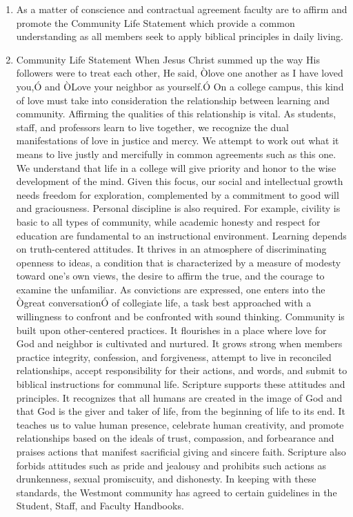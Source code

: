 \documentclass[letterpaper, 11pt]{article}
\begin{document}
				\begin{enumerate}[label=\alph*)]
					\item{As a matter of conscience and contractual agreement faculty are to affirm and promote the Community Life Statement which provide a common understanding as all members seek to apply biblical principles in daily living.}
					\item{Community Life Statement
						When Jesus Christ summed up the way His followers were to treat each other, He said, Òlove one another as I have loved you,Ó and ÒLove your neighbor as yourself.Ó  On a college campus, this kind of love must take into consideration the relationship between learning and community.
						Affirming the qualities of this relationship is vital.  As students, staff, and professors learn to live together, we recognize the dual manifestations of love in justice and mercy.  We attempt to work out what it means to live justly and mercifully in common agreements such as this one.  We understand that life in a college will give priority and honor to the wise development of the mind.
						Given this focus, our social and intellectual growth needs freedom for exploration, complemented by a commitment to good will and graciousness.  Personal discipline is also required.  For example, civility is basic to all types of community, while academic honesty and respect for education are fundamental to an instructional environment.
						Learning depends on truth-centered attitudes.  It thrives in an atmosphere of discriminating openness to ideas, a condition that is characterized by a measure of modesty toward one's own views, the desire to affirm the true, and the courage to examine the unfamiliar.  As convictions are expressed, one enters into the Ògreat conversationÓ of collegiate life, a task best approached with a willingness to confront and be confronted with sound thinking.
						Community is built upon other-centered practices.  It flourishes in a place where love for God and neighbor is cultivated and nurtured.  It grows strong when members practice integrity, confession, and forgiveness, attempt to live in reconciled relationships, accept responsibility for their actions, and words, and submit to biblical instructions for communal life.
						Scripture supports these attitudes and principles.  It recognizes that all humans are created in the image of God and that God is the giver and taker of life, from the beginning of life to its end.  It teaches us to value human presence, celebrate human creativity, and promote relationships based on the ideals of trust, compassion, and forbearance and praises actions that manifest sacrificial giving and sincere faith.  Scripture also forbids attitudes such as pride and jealousy and prohibits such actions as drunkenness, sexual promiscuity, and dishonesty.  In keeping with these standards, the Westmont community has agreed to certain guidelines in the Student, Staff, and Faculty Handbooks.
}
\end{enumerate}
\end{document}
